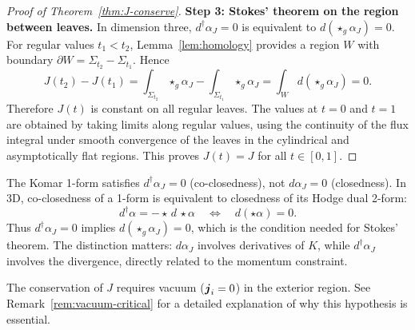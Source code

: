 \begin{proof}[Proof of Theorem~\ref{thm:J-conserve}]
\textbf{Step 3: Stokes' theorem on the region between leaves.}
In dimension three, $d^\dagger \alpha_J = 0$ is equivalent to $d(\star_g \alpha_J) = 0$. For regular values $t_1<t_2$, Lemma~\ref{lem:homology} provides a region $W$ with boundary $\partial W=\Sigma_{t_2}-\Sigma_{t_1}$. Hence
\[
J(t_2) - J(t_1) = \int_{\Sigma_{t_2}} \star_g \alpha_J - \int_{\Sigma_{t_1}} \star_g \alpha_J = \int_W d(\star_g \alpha_J) = 0.
\]
Therefore $J(t)$ is constant on all regular leaves. The values at $t=0$ and $t=1$ are obtained by taking limits along regular values, using the continuity of the flux integral under smooth convergence of the leaves in the cylindrical and asymptotically flat regions. This proves $J(t)=J$ for all $t\in[0,1]$.
\end{proof}

\begin{remark}\label{rem:closed-vs-coclosed}
The Komar 1-form satisfies $d^\dagger \alpha_J = 0$ (co-closedness), not $d\alpha_J = 0$ (closedness). In 3D, co-closedness of a 1-form is equivalent to closedness of its Hodge dual 2-form:
\[
d^\dagger \alpha = -\star\, d\, \star \alpha \quad \Longleftrightarrow \quad d(\star \alpha) = 0.
\]
Thus $d^\dagger \alpha_J = 0$ implies $d(\star_g \alpha_J) = 0$, which is the condition needed for Stokes' theorem. The distinction matters: $d\alpha_J$ involves derivatives of $K$, while $d^\dagger \alpha_J$ involves the divergence, directly related to the momentum constraint.
\end{remark}

\begin{remark}
The conservation of $J$ requires vacuum ($\boldsymbol{j}_i = 0$) in the exterior region. See Remark~\ref{rem:vacuum-critical} for a detailed explanation of why this hypothesis is essential.
\end{remark}

